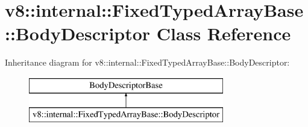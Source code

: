 \hypertarget{classv8_1_1internal_1_1_fixed_typed_array_base_1_1_body_descriptor}{}\section{v8\+:\+:internal\+:\+:Fixed\+Typed\+Array\+Base\+:\+:Body\+Descriptor Class Reference}
\label{classv8_1_1internal_1_1_fixed_typed_array_base_1_1_body_descriptor}
Inheritance diagram for v8\+:\+:internal\+:\+:Fixed\+Typed\+Array\+Base\+:\+:Body\+Descriptor\+:\begin{figure}[H]
\begin{center}
\leavevmode
\includegraphics[height=2.000000cm]{classv8_1_1internal_1_1_fixed_typed_array_base_1_1_body_descriptor}
\end{center}
\end{figure}
